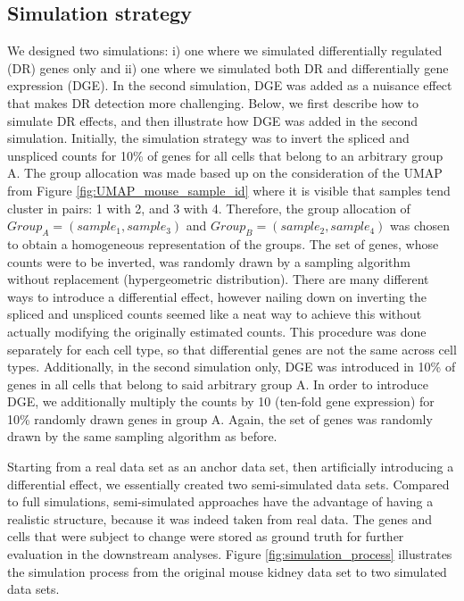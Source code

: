 \subsection{Simulation strategy}
We designed two simulations: i) one where we simulated differentially regulated (DR) genes only and ii) one where we simulated both DR and differentially gene expression (DGE). In the second simulation, DGE was added as a nuisance effect that makes DR detection more challenging. Below, we first describe how to simulate DR effects, and then illustrate how DGE was added in the second simulation. Initially, the simulation strategy was to invert the spliced and unspliced counts for 10\% of genes for all cells that belong to an arbitrary group A. The group allocation was made based up on the consideration of the UMAP from Figure \ref{fig:UMAP_mouse_sample_id} where it is visible that samples tend cluster in pairs: 1 with 2, and 3 with 4. Therefore, the group allocation of $Group_A=(sample_1, sample_3)$ and $Group_B=(sample_2, sample_4)$ was chosen to obtain a homogeneous representation of the groups. The set of genes, whose counts were to be inverted, was randomly drawn by a sampling algorithm without replacement (hypergeometric distribution). There are many different ways to introduce a differential effect, however nailing down on inverting the spliced and unspliced counts seemed like a neat way to achieve this without actually modifying the originally estimated counts. This procedure was done separately for each cell type, so that differential genes are not the same across cell types. Additionally, in the second simulation only, DGE was introduced in 10\% of genes in all cells that belong to said arbitrary group A. In order to introduce DGE, we additionally multiply the counts by 10 (ten-fold gene expression) for 10\% randomly drawn genes in group A. Again, the set of genes was randomly drawn by the same sampling algorithm as before. 

Starting from a real data set as an anchor data set, then artificially introducing a differential effect, we essentially created two semi-simulated data sets. Compared to full simulations, semi-simulated approaches have the advantage of having a realistic structure, because it was indeed taken from real data. The genes and cells that were subject to change were stored as ground truth for further evaluation in the downstream analyses. Figure \ref{fig:simulation_process} illustrates the simulation process from the original mouse kidney data set to two simulated data sets.

